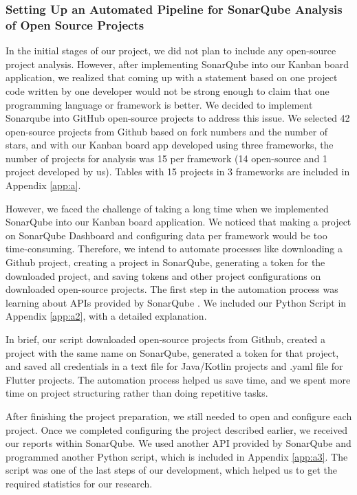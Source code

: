 \subsubsection{Setting Up an Automated Pipeline for SonarQube Analysis of Open Source Projects}
In the initial stages of our project, we did not plan to include any open-source project analysis. However, after implementing SonarQube into our Kanban board application, we realized that coming up with a statement based on one project code written by one developer would not be strong enough to claim that one programming language or framework is better. We decided to implement Sonarqube into GitHub open-source projects to address this issue. We selected 42 open-source projects from Github based on fork numbers and the number of stars, and with our Kanban board app developed using three frameworks, the number of projects for analysis was 15 per framework (14 open-source and 1 project developed by us). Tables with 15 projects in 3 frameworks are included in Appendix \ref{app:a}. 
\par
However, we faced the challenge of taking a long time when we implemented SonarQube into our Kanban board application. We noticed that making a project on SonarQube Dashboard and configuring data per framework would be too time-consuming. Therefore, we intend to automate processes like downloading a Github project, creating a project in SonarQube, generating a token for the downloaded project, and saving tokens and other project configurations on downloaded open-source projects. The first step in the automation process was learning about APIs provided by SonarQube \cite{sonarQube}. We included our Python Script in Appendix \ref{app:a2}, with a detailed explanation. 
\par
In brief, our script downloaded open-source projects from Github, created a project with the same name on SonarQube, generated a token for that project, and saved all credentials in a text file for Java/Kotlin projects and .yaml file for Flutter projects. The automation process helped us save time, and we spent more time on project structuring rather than doing repetitive tasks. 
\par
After finishing the project preparation, we still needed to open and configure each project. Once we completed configuring the project described earlier, we received our reports within SonarQube. We used another API provided by SonarQube and programmed another Python script, which is included in Appendix \ref{app:a3}. The script was one of the last steps of our development, which helped us to get the required statistics for our research.
